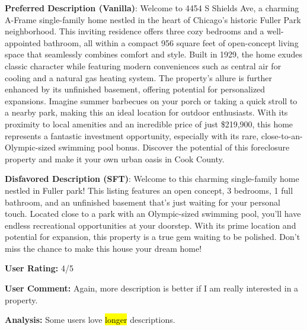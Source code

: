 \begin{center}\begin{tcolorbox}[colback=white,colframe=gray!20,width=0.95\textwidth]
   {\footnotesize \textbf{Preferred Description (Vanilla)}:  Welcome to 4454 S Shields Ave, a charming A-Frame single-family home nestled in the heart of Chicago's historic Fuller Park neighborhood. This inviting residence offers three cozy bedrooms and a well-appointed bathroom, all within a compact 956 square feet of open-concept living space that seamlessly combines comfort and style. Built in 1929, the home exudes classic character while featuring modern conveniences such as central air for cooling and a natural gas heating system. The property's allure is further enhanced by its unfinished basement, offering potential for personalized expansions. Imagine summer barbecues on your porch or taking a quick stroll to a nearby park, making this an ideal location for outdoor enthusiasts. With its proximity to local amenities and an incredible price of just \$219,900, this home represents a fantastic investment opportunity, especially with its rare, close-to-an-Olympic-sized swimming pool bonus. Discover the potential of this foreclosure property and make it your own urban oasis in Cook County. }
    \vspace{0.2em}

    {\footnotesize \textbf{Disfavored Description (SFT)}:  Welcome to this charming single-family home nestled in Fuller park! This listing features an open concept, 3 bedrooms, 1 full bathroom, and an unfinished basement that's just waiting for your personal touch. Located close to a park with an Olympic-sized swimming pool, you'll have endless recreational opportunities at your doorstep. With its prime location and potential for expansion, this property is a true gem waiting to be polished. Don't miss the chance to make this house your dream home! }
    \vspace{0.2em}

    {\footnotesize \textbf{User Rating:} 4/5 }
    \vspace{0.2em}

    {\footnotesize \textbf{User Comment:} Again, more description is better if I am really interested in a property. }
    \vspace{0.2em}

   {\footnotesize \textbf{Analysis:} Some users love \hl{longer} descriptions.  }
    \end{tcolorbox}\end{center}

